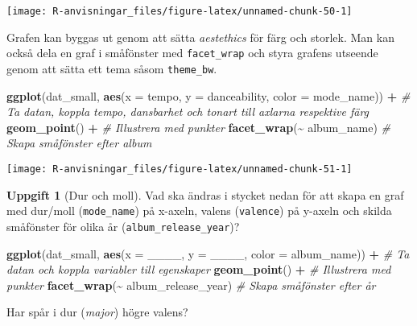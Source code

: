 \documentclass[
]{book}
\newenvironment{Shaded}{\begin{snugshade}}{\end{snugshade}}
\newcommand{\AttributeTok}[1]{\textcolor[rgb]{0.13,0.29,0.53}{#1}}
\newcommand{\CommentTok}[1]{\textcolor[rgb]{0.56,0.35,0.01}{\textit{#1}}}
\newcommand{\FunctionTok}[1]{\textcolor[rgb]{0.13,0.29,0.53}{\textbf{#1}}}
\newcommand{\NormalTok}[1]{#1}
\newcommand{\SpecialCharTok}[1]{\textcolor[rgb]{0.81,0.36,0.00}{\textbf{#1}}}
\theoremstyle{definition}
\theoremstyle{definition}
\theoremstyle{definition}
\newtheorem{exercise}{Uppgift}[chapter]
\theoremstyle{definition}
\theoremstyle{remark}
\begin{document}
\begin{center}\texttt{[image: R-anvisningar\_files/figure-latex/unnamed-chunk-50-1]} \end{center}

Grafen kan byggas ut genom att sätta \emph{aestethics} för färg och storlek. Man kan också dela en graf i småfönster med \texttt{facet\_wrap} och styra grafens utseende genom att sätta ett tema såsom \texttt{theme\_bw}.

\begin{Shaded}
\begin{Highlighting}[]
\FunctionTok{ggplot}\NormalTok{(dat\_small, }\FunctionTok{aes}\NormalTok{(}\AttributeTok{x =}\NormalTok{ tempo, }\AttributeTok{y =}\NormalTok{ danceability, }\AttributeTok{color =}\NormalTok{ mode\_name)) }\SpecialCharTok{+}   \CommentTok{\# Ta datan, koppla tempo, dansbarhet och tonart till axlarna respektive färg}
  \FunctionTok{geom\_point}\NormalTok{() }\SpecialCharTok{+}                                                           \CommentTok{\# Illustrera med punkter}
  \FunctionTok{facet\_wrap}\NormalTok{(}\SpecialCharTok{\textasciitilde{}}\NormalTok{ album\_name)                                                 }\CommentTok{\# Skapa småfönster efter album}
\end{Highlighting}
\end{Shaded}

\begin{center}\texttt{[image: R-anvisningar\_files/figure-latex/unnamed-chunk-51-1]} \end{center}

\begin{exercise}[Dur och moll]
Vad ska ändras i stycket nedan för att skapa en graf med dur/moll (\texttt{mode\_name}) på x-axeln, valens (\texttt{valence}) på y-axeln och skilda småfönster för olika år (\texttt{album\_release\_year})?

\begin{Shaded}
\begin{Highlighting}[]
\FunctionTok{ggplot}\NormalTok{(dat\_small, }\FunctionTok{aes}\NormalTok{(}\AttributeTok{x =}\NormalTok{ \_\_\_\_, }\AttributeTok{y =}\NormalTok{ \_\_\_\_, }\AttributeTok{color =}\NormalTok{ album\_name)) }\SpecialCharTok{+} \CommentTok{\# Ta datan och koppla variabler till egenskaper}
  \FunctionTok{geom\_point}\NormalTok{() }\SpecialCharTok{+}                                                 \CommentTok{\# Illustrera med punkter}
  \FunctionTok{facet\_wrap}\NormalTok{(}\SpecialCharTok{\textasciitilde{}}\NormalTok{ album\_release\_year)                               }\CommentTok{\# Skapa småfönster efter år}
\end{Highlighting}
\end{Shaded}

Har spår i dur (\emph{major}) högre valens?
\end{exercise}
\end{document}
